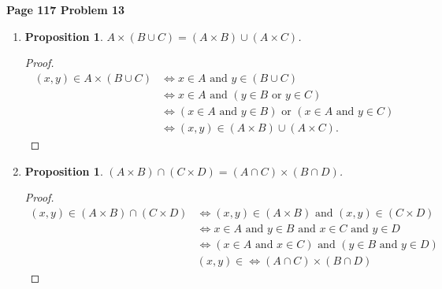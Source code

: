 \documentclass{article}
\newtheorem{prop}[thm]{Proposition}
\begin{document}
\textbf{Page 117 Problem 13}
\begin{enumerate}[label={(\roman*)}]
    \item 
    \begin{prop}
        $A \times (B \cup C) = (A \times B) \cup (A \times C)$.
    \end{prop}
    \begin{proof}
        \begin{align}
            (x,y) \in A \times (B \cup C) & \Leftrightarrow x \in A \text{ and } y \in (B \cup C) \\
            & \Leftrightarrow x \in A \text{ and } (y \in B \text{ or } y \in C) \\
            & \Leftrightarrow (x \in A \text{ and } y \in B) \text{ or } (x \in A \text{ and } y \in C) \\
            & \Leftrightarrow (x,y) \in (A \times B) \cup (A \times C).
        \end{align}
    \end{proof}

    \item 
    \begin{prop}
        $(A \times B) \cap (C \times D) = (A \cap C) \times (B \cap D)$.
    \end{prop}
    \begin{proof}
        \begin{align}
            (x,y) \in (A\times B) \cap (C\times D) & \Leftrightarrow (x,y) \in (A\times B) \text{ and } (x,y) \in (C\times D) \\
            & \Leftrightarrow x \in A \text{ and } y \in B \text{ and } x\in C \text{ and } y\in D \\
            & \Leftrightarrow (x \in A \text{ and } x\in C) \text{ and } (y \in B \text{ and } y\in D) \\
            & (x,y) \in \Leftrightarrow (A \cap C) \times (B \cap D)
        \end{align}
    \end{proof}
\end{enumerate}
\bigbreak
\end{document}
